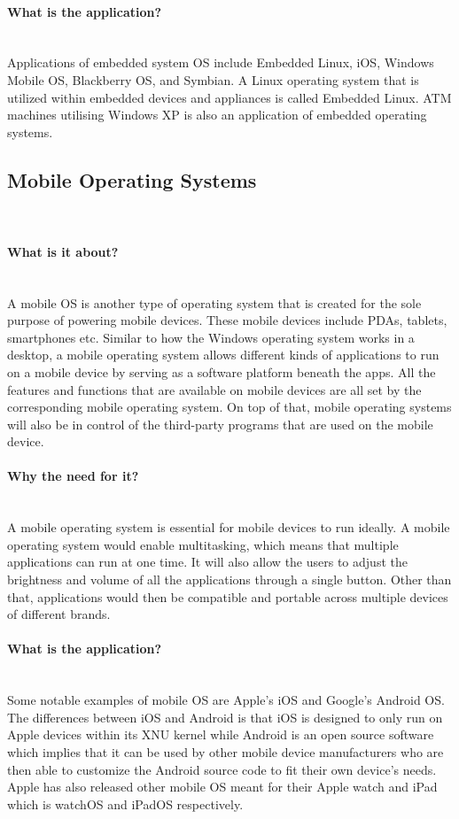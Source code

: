 \documentclass[conference]{IEEEtran}
\newcommand{\forceindent}{\leavevmode{\parindent=1em\indent}}
\begin{document}
\paragraph{What is the application?}\mbox{} \\
\forceindent Applications of embedded system OS include Embedded Linux, iOS, Windows Mobile OS, Blackberry OS, and Symbian. A Linux operating system that is utilized within embedded devices and appliances is called Embedded Linux. ATM machines utilising Windows XP is also an application of embedded operating systems.

\subsection{Mobile Operating Systems}\\
\paragraph{What is it about?}\mbox{} \\
\forceindent A mobile OS is another type of operating system that is created for the sole purpose of powering mobile devices. These mobile devices include PDAs, tablets, smartphones etc. Similar to how the Windows operating system works in a desktop, a mobile operating system allows different kinds of applications to run on a mobile device by serving as a software platform beneath the apps. All the features and functions that are available on mobile devices are all set by the corresponding mobile operating system. On top of that, mobile operating systems will also be in control of the third-party programs that are used on the mobile device.
\medskip
\\
\paragraph{Why the need for it?}\mbox{} \\
\forceindent A mobile operating system is essential for mobile devices to run ideally. A mobile operating system would enable multitasking, which means that multiple applications can run at one time. It will also allow the users to adjust the brightness and volume of all the applications through a single button. Other than that, applications would then be compatible and portable across multiple devices of different brands.
\\
\medskip
\paragraph{What is the application?}\mbox{} \\
\forceindent Some notable examples of mobile OS are Apple’s iOS and Google’s Android OS. The differences between iOS and Android is that iOS is designed to only run on Apple devices within its XNU kernel while Android is an open source software which implies that it can be used by other mobile device manufacturers who are then able to customize the Android source code to fit their own device’s needs. Apple has also released other mobile OS meant for their Apple watch and iPad which is watchOS and iPadOS respectively\cite{CSMOS}.
\end{document}
